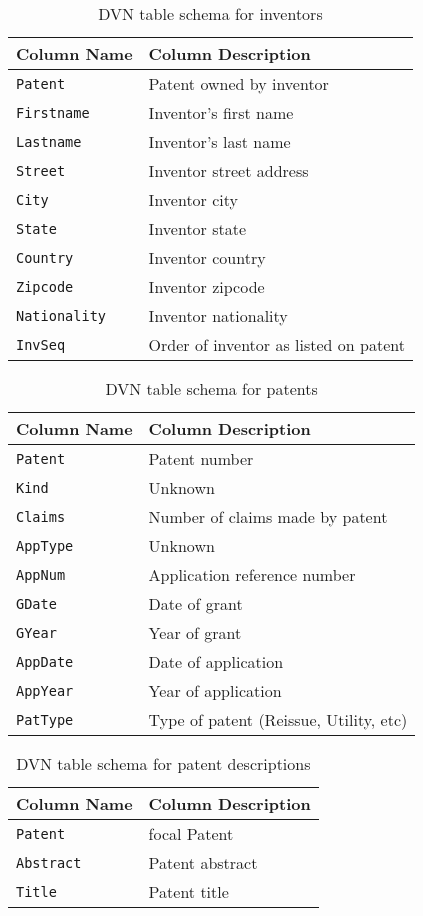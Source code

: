 \begin{table*}
\center
\begin{tabular}{| l | l |}
\hline
Column Name & Column Description \\
\hline
\verb`Patent` & Patent owned by inventor \\
\verb`Firstname` & Inventor's first name \\
\verb`Lastname` & Inventor's last name \\
\verb`Street` & Inventor street address \\
\verb`City` & Inventor city \\
\verb`State` & Inventor state \\
\verb`Country` & Inventor country \\
\verb`Zipcode` & Inventor zipcode \\
\verb`Nationality` & Inventor nationality \\
\verb`InvSeq` & Order of inventor as listed on patent \\
\hline
\end{tabular}
\caption{DVN table schema for inventors}
\end{table*}

\begin{table*}
\center
\begin{tabular}{| l | l |}
\hline
Column Name & Column Description \\
\hline
\verb`Patent` & Patent number \\
\verb`Kind` & Unknown \\
\verb`Claims` & Number of claims made by patent \\
\verb`AppType` & Unknown \\
\verb`AppNum` & Application reference number \\
\verb`GDate` & Date of grant \\
\verb`GYear` & Year of grant \\
\verb`AppDate` & Date of application \\
\verb`AppYear` & Year of application \\
\verb`PatType` & Type of patent (Reissue, Utility, etc) \\
\hline
\end{tabular}
\caption{DVN table schema for patents}
\end{table*}

\begin{table*}
\center
\begin{tabular}{| l | l |}
\hline
Column Name & Column Description \\
\hline
\verb`Patent` & focal Patent \\
\verb`Abstract` & Patent abstract \\
\verb`Title` & Patent title \\
\hline
\end{tabular}
\caption{DVN table schema for patent descriptions}
\end{table*}

